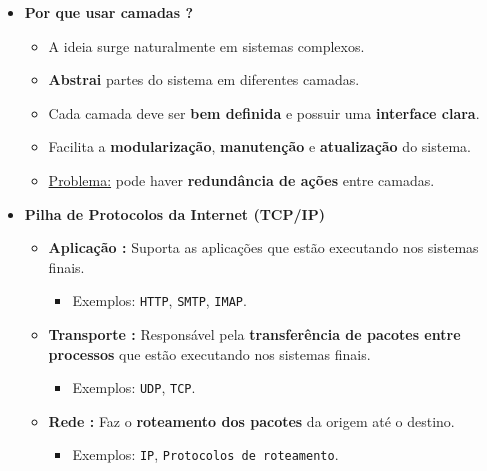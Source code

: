 \begin{itemize}[left=0.5cm, align=left, nosep]
        \item \textbf{Por que usar camadas ?} 
            \begin{itemize}[left=0.5cm, nosep, label=$\hookrightarrow$]
                \item A ideia surge naturalmente em sistemas complexos. 
                \item \textbf{Abstrai} partes do sistema em diferentes camadas. 
                \item Cada camada deve ser \textbf{bem definida} e possuir uma \textbf{interface clara}. 
                \item Facilita a \textbf{modularização}, \textbf{manutenção} e \textbf{atualização} do sistema. 
                \item \underline{Problema:} pode haver \textbf{redundância de ações} entre camadas. 
            \end{itemize} 
        
        \item \textbf{Pilha de Protocolos da Internet (TCP/IP)}
            \begin{itemize}[left=0.5cm, nosep, label=$\hookrightarrow$]    
                
                \item \textbf{Aplicação :} Suporta as aplicações que estão executando nos sistemas finais.
                \begin{itemize}[left=0.5cm, nosep, label=$-$]
                    \item Exemplos: \texttt{HTTP}, \texttt{SMTP}, \texttt{IMAP}.
                \end{itemize}
                
                \item \textbf{Transporte :} Responsável pela \textbf{transferência de pacotes entre processos} que estão executando nos sistemas finais.
                \begin{itemize}[left=0.5cm, nosep, label=$-$]
                    \item Exemplos: \texttt{UDP}, \texttt{TCP}.
                \end{itemize}
                
                \item \textbf{Rede :} Faz o \textbf{roteamento dos pacotes} da origem até o destino.
                \begin{itemize}[left=0.5cm, nosep, label=$-$]
                    \item Exemplos: \texttt{IP}, \texttt{Protocolos de roteamento}.
                \end{itemize}


\end{itemize}
\end{itemize}
